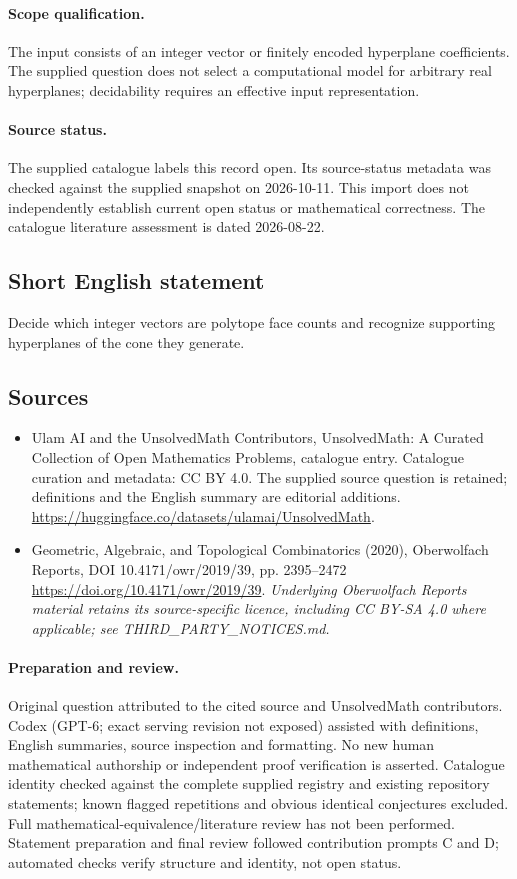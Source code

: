 \documentclass[11pt]{article}
\begin{document}
\paragraph{Scope qualification.}
The input consists of an integer vector or finitely encoded hyperplane coefficients. The supplied question does not select a computational model for arbitrary real hyperplanes; decidability requires an effective input representation.
\paragraph{Source status.}
The supplied catalogue labels this record open. Its source-status metadata was checked against the supplied snapshot on 2026-10-11. This import does not independently establish current open status or mathematical correctness. The catalogue literature assessment is dated 2026-08-22.
\subsection{Short English statement}
Decide which integer vectors are polytope face counts and recognize supporting hyperplanes of the cone they generate.
\subsection{Sources}
\begin{itemize}
\item[S1] Ulam AI and the UnsolvedMath Contributors, UnsolvedMath: A Curated Collection of Open Mathematics Problems, catalogue entry. Catalogue curation and metadata: CC BY 4.0. The supplied source question is retained; definitions and the English summary are editorial additions.
\url{https://huggingface.co/datasets/ulamai/UnsolvedMath}.
\item[S2] Geometric, Algebraic, and Topological Combinatorics (2020), Oberwolfach Reports, DOI 10.4171/owr/2019/39, pp. 2395--2472
\url{https://doi.org/10.4171/owr/2019/39}.
\textit{Underlying Oberwolfach Reports material retains its source-specific licence, including CC BY-SA 4.0 where applicable; see THIRD\_PARTY\_NOTICES.md.}
\end{itemize}
\paragraph{Preparation and review.}
Original question attributed to the cited source and UnsolvedMath contributors. Codex (GPT-6; exact serving revision not exposed) assisted with definitions, English summaries, source inspection and formatting. No new human mathematical authorship or independent proof verification is asserted. Catalogue identity checked against the complete supplied registry and existing repository statements; known flagged repetitions and obvious identical conjectures excluded. Full mathematical-equivalence/literature review has not been performed. Statement preparation and final review followed contribution prompts C and D; automated checks verify structure and identity, not open status.
\label{end:statement}
\end{document}
